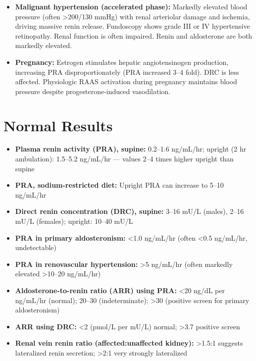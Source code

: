 \begin{itemize}
  \item \textbf{Malignant hypertension (accelerated phase):} Markedly elevated blood pressure (often >200/130 mmHg) with renal arteriolar damage and ischemia, driving massive renin release. Fundoscopy shows grade III or IV hypertensive retinopathy. Renal function is often impaired. Renin and aldosterone are both markedly elevated.
  \item \textbf{Pregnancy:} Estrogen stimulates hepatic angiotensinogen production, increasing PRA disproportionately (PRA increased 3--4 fold). DRC is less affected. Physiologic RAAS activation during pregnancy maintains blood pressure despite progesterone-induced vasodilation.
\end{itemize}

\section*{Normal Results}
\begin{itemize}
  \item \textbf{Plasma renin activity (PRA), supine:} 0.2--1.6 ng/mL/hr; upright (2 hr ambulation): 1.5--5.2 ng/mL/hr --- values 2--4 times higher upright than supine
  \item \textbf{PRA, sodium-restricted diet:} Upright PRA can increase to 5--10 ng/mL/hr
  \item \textbf{Direct renin concentration (DRC), supine:} 3--16 mU/L (males), 2--16 mU/L (females); upright: 10--40 mU/L
  \item \textbf{PRA in primary aldosteronism:} <1.0 ng/mL/hr (often <0.5 ng/mL/hr, undetectable)
  \item \textbf{PRA in renovascular hypertension:} >5 ng/mL/hr (often markedly elevated >10--20 ng/mL/hr)
  \item \textbf{Aldosterone-to-renin ratio (ARR) using PRA:} <20 ng/dL per ng/mL/hr (normal); 20--30 (indeterminate); >30 (positive screen for primary aldosteronism)
  \item \textbf{ARR using DRC:} <2 (pmol/L per mU/L) normal; >3.7 positive screen
  \item \textbf{Renal vein renin ratio (affected:unaffected kidney):} >1.5:1 suggests lateralized renin secretion; >2:1 very strongly lateralized
\end{itemize}

